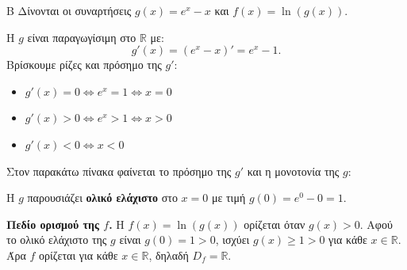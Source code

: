 \begin{thema}{Β}
Δίνονται οι συναρτήσεις $g(x) = e^x - x$ και $f(x) = \ln(g(x))$.

\begin{erwthma}

\item Η $g$ είναι παραγωγίσιμη στο $\mathbb{R}$ με:
\[
g'(x) =\left(e^x-x\right)'= e^x - 1.
\]
Βρίσκουμε ρίζες και πρόσημο της $g'$:
\begin{itemize}
    \item $g'(x)=0 \Leftrightarrow e^x=1 \Leftrightarrow x=0$
    \item $g'(x)>0 \Leftrightarrow e^x>1 \Leftrightarrow x>0$
    \item $g'(x)<0 \Leftrightarrow x<0$
\end{itemize}
Στον παρακάτω πίνακα φαίνεται το πρόσημο της $g'$ και η μονοτονία της $g$:
\begin{center}
\end{center}
Η $g$ παρουσιάζει \textbf{ολικό ελάχιστο} στο $x=0$ με τιμή $g(0)=e^0-0=1$.

\textbf{Πεδίο ορισμού της $f$.}
Η $f(x)=\ln(g(x))$ ορίζεται όταν $g(x)>0$.
Αφού το ολικό ελάχιστο της $g$ είναι $g(0)=1>0$, ισχύει $g(x)\geq1>0$ για κάθε $x\in\mathbb{R}$. Άρα $f$ ορίζεται για κάθε $x\in\mathbb{R}$, δηλαδή $D_f=\mathbb{R}$.


\end{erwthma}
\end{thema}
